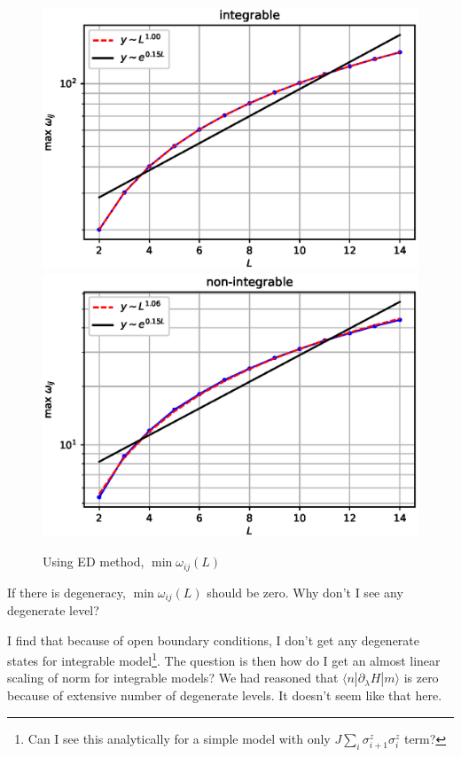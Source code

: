 \documentclass[11pt,a4paper]{article}
\begin{document}
 
\begin{figure}[!ht]
\begin{center}
\includegraphics[scale=0.53]{new_pics/v2_maxwij_int.eps}
\includegraphics[scale=0.53]{new_pics/v2_maxwij_nonint.eps}
\caption{Using ED method, $\min \omega_{ij}(L)$}
\end{center}
\end{figure}



If there is degeneracy, $\min \omega_{ij}(L)$ should be zero. Why don't I see any degenerate level?

I find that because of open boundary conditions, I don't get any degenerate states for integrable model\footnote{Can I see this analytically for a simple model with only $J \sum_i\sigma_{i+1}^z \sigma_{i}^z$ term?}. The question is then how do I get an almost linear scaling of norm for integrable models? We had reasoned that $\langle n| \partial_{\lambda} H|m\rangle$ is zero because of extensive number of degenerate levels. It doesn't seem like that here.
\end{document}
